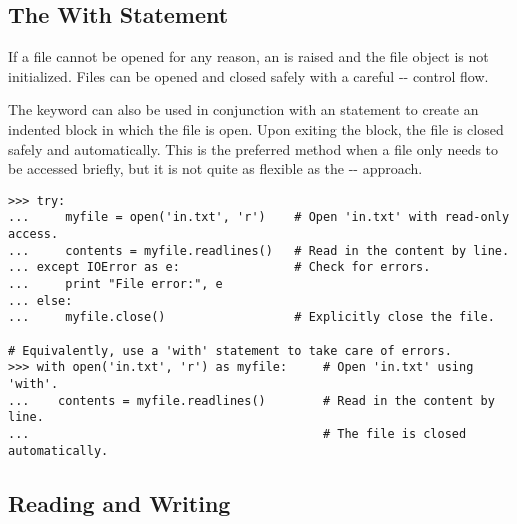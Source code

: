 \subsection*{The With Statement}

If a file cannot be opened for any reason, an  is raised and the file object is not initialized.
Files can be opened and closed safely with a careful -- control flow.

The keyword  can also be used in conjunction with an  statement to create an indented block in which the file is open.
Upon exiting the block, the file is closed safely and automatically.
This is the preferred method when a file only needs to be accessed briefly, but it is not quite as flexible as the -- approach.

\begin{lstlisting}
>>> try:
...     myfile = open('in.txt', 'r')    # Open 'in.txt' with read-only access.
...     contents = myfile.readlines()   # Read in the content by line.
... except IOError as e:                # Check for errors.
...     print "File error:", e
... else:
...     myfile.close()                  # Explicitly close the file.

# Equivalently, use a 'with' statement to take care of errors.
>>> with open('in.txt', 'r') as myfile:     # Open 'in.txt' using 'with'.
...    contents = myfile.readlines()        # Read in the content by line.
...                                         # The file is closed automatically.
\end{lstlisting}

\subsection*{Reading and Writing}

